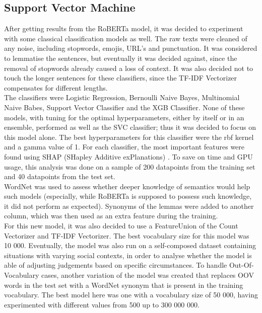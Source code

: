\documentclass[final]{clv3} %
\begin{document}
\subsection{Support Vector Machine}

After getting results from the RoBERTa model, it was decided to experiment with some classical classification models as well. The raw texts were cleaned of any noise, including stopwords, emojis, URL’s and punctuation. It was considered to lemmatise the sentences, but eventually it was decided against, since the removal of stopwords already caused a loss of context. It was also decided not to touch the longer sentences for these classifiers, since the TF-IDF Vectorizer compensates for different lengths.\\

The classifiers were Logistic Regression, Bernoulli Naive Bayes, Multinomial Naive Babes, Support Vector Classifier and the XGB Classifier. None of these models, with tuning for the optimal hyperparameters, either by itself or in an ensemble, performed as well as the SVC classifier; thus it was decided to focus on this model alone. The best hyperparameters for this classifier were the rbf kernel and a gamma value of 1. For each classifier, the most important features were found using SHAP (SHapley Additive exPlanations) \cite{shap}. To save on time and GPU usage, this analysis was done on a sample of 200 datapoints from the training set and 40 datapoints from the test set. \\

WordNet \cite{miller} was used to assess whether deeper knowledge of semantics would help such models (especially, while RoBERTa is supposed to possess such knowledge, it did not perform as expected). Synonyms of the lemmas were added to another column, which was then used as an extra feature during the training. \\

For this new model, it was also decided to use a FeatureUnion of the Count Vectorizer and TF-IDF Vectorizer. The best vocabulary size for this model was 10 000. Eventually, the model was also run on a self-composed dataset containing situations with varying social contexts, in order to analyse whether the model is able of adjusting judgements based on specific circumstances. To handle Out-Of-Vocabulary cases, another variation of the model was created that replaces OOV words in the test set with a WordNet synonym that is present in the training vocabulary. The best model here was one with a vocabulary size of 50 000, having experimented with different values from 500 up to 300 000 000.
\end{document}
